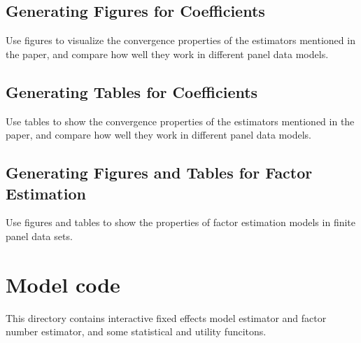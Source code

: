 \documentclass[a4paper,11pt,english]{sphinxmanual}
\begin{document}
\section{Generating Figures for Coefficients}
\label{\detokenize{final:generating-figures-for-coefficients}}\label{\detokenize{final:module-src.final.task_figures_coefficient}}
\sphinxAtStartPar
Use figures to visualize the convergence properties of the estimators mentioned
in the paper, and compare how well they work in different panel data models.


\section{Generating Tables for Coefficients}
\label{\detokenize{final:generating-tables-for-coefficients}}\label{\detokenize{final:module-src.final.task_tables_coefficient}}
\sphinxAtStartPar
Use tables to show the convergence properties of the estimators mentioned in the
paper, and compare how well they work in different panel data models.


\section{Generating Figures and Tables for Factor Estimation}
\label{\detokenize{final:generating-figures-and-tables-for-factor-estimation}}\label{\detokenize{final:module-src.final.task_figures_tables_factor}}
\sphinxAtStartPar
Use figures and tables to show the properties of factor estimation models in finite
panel data sets.


\chapter{Model code}
\label{\detokenize{model_code:model-code}}\label{\detokenize{model_code:id1}}\label{\detokenize{model_code::doc}}
\sphinxAtStartPar
This directory  contains interactive fixed effects model estimator and
factor number estimator, and some statistical and utility funcitons.
\end{document}
